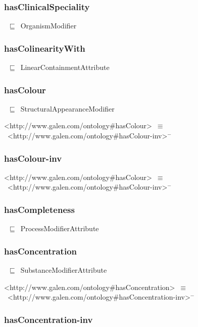 \documentclass{article}
\begin{document}
\subsubsection*{hasClinicalSpeciality}

~\ensuremath{\sqsubseteq}~OrganismModifier

\subsubsection*{hasColinearityWith}

~\ensuremath{\sqsubseteq}~LinearContainmentAttribute

\subsubsection*{hasColour}

~\ensuremath{\sqsubseteq}~StructuralAppearanceModifier

<http://www.galen.com/ontology#hasColour>~\ensuremath{\equiv}~<http://www.galen.com/ontology#hasColour-inv>\ensuremath{^-}

\subsubsection*{hasColour-inv}

<http://www.galen.com/ontology#hasColour>~\ensuremath{\equiv}~<http://www.galen.com/ontology#hasColour-inv>\ensuremath{^-}

\subsubsection*{hasCompleteness}

~\ensuremath{\sqsubseteq}~ProcessModifierAttribute

\subsubsection*{hasConcentration}

~\ensuremath{\sqsubseteq}~SubstanceModifierAttribute

<http://www.galen.com/ontology#hasConcentration>~\ensuremath{\equiv}~<http://www.galen.com/ontology#hasConcentration-inv>\ensuremath{^-}

\subsubsection*{hasConcentration-inv}
\end{document}
